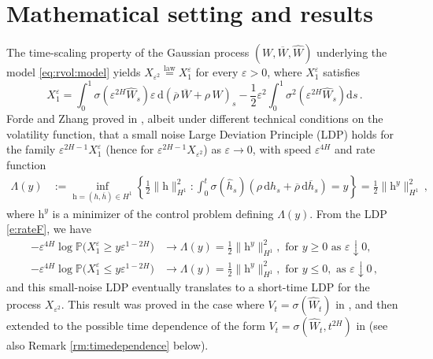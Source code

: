 \documentclass[11pt]{article}
\def\eqlaw{\stackrel{\mathrm{law}}{=}}
\theoremstyle{plain}
\theoremstyle{definition}
\theoremstyle{remark}
\renewcommand{\bar}{\overline}
\renewcommand{\hat}{\widehat}
\newcommand{\dd}{\mathrm{d}}
\newcommand{\bP}{\mathbb{P}}
\newcommand{\1}{\mathbf{1}}
\numberwithin{equation}{section}
\def\eps{\varepsilon}
\def\h{\mathrm h}
\begin{document}
\section{Mathematical setting and results}\label{sec:main_results}
\noindent The time-scaling property of the Gaussian process	$(W, \bar W, \hat W)$ underlying the model \eqref{eq:rvol:model}
yields $X_{\eps^2} \eqlaw X_1^{\varepsilon}$ for every $\eps > 0$, where $X_1^{\varepsilon}$ satisfies
\begin{equation}\label{eq:rescX}
X_1^{\varepsilon} 
=
\int_{0}^1 \sigma \left( \eps^{2H} \hat W_s \right) \varepsilon \,
\dd \left(\bar{\rho} \, \bar W+\rho \, W\right)_s -\frac{1}{2}\varepsilon ^{2}\int_{0}^1
\sigma^2 \left(   \eps^{2H} \hat W_s\right) \dd s \,.
\end{equation} 
Forde and Zhang proved in \cite{forde2017asymptotics}, albeit under different technical conditions on the volatility function,
that a small noise Large Deviation Principle (LDP) holds for the 
family $\eps^{2 H - 1} X^{\eps}_1$ (hence for $\eps^{2 H - 1} X_{\eps^2}$) as $\eps \to 0$, with speed $\eps^{4H}$ and rate function 
\begin{align} \label{e:rateF}
\Lambda(y) & :=\inf_{\h = (h, \bar h) \in H^{1}}\left\{
\frac 12 \| \h \|_{H^1}^2 :
\int_0^t \sigma\left(\hat h_s\right) (\rho \,\dd h_s + \bar \rho \, \dd \bar h_s)
= y\right\}
= 
\frac 12  \| \h^y \|_{H^1}^2 \,,
\end{align}
where $\h^y$ is a minimizer of the control problem defining $\Lambda(y)$.
From the LDP \eqref{e:rateF}, we have
\begin{align}\label{eq:ldp:sn}
     - \eps^{4H} \log \bP \bigl( X_1^\eps \geq y \eps^{1-2H} \bigr) &\rightarrow  \Lambda(y)= \frac{1}{2} \| { \h}^y  \|^2_{H^1},  \mbox{ for } y \geq 0 \mbox{ as } \eps \downarrow 0,
\\
     - \eps^{4H} \log \bP \bigl( X_1^\eps \leq y\eps^{1-2H} \bigr) &\rightarrow \Lambda (y)=
     \frac{1}{2} \| { \h}^y  \|^2_{H^1}, \mbox{ for } y \leq 0, \mbox{ as } \eps \downarrow 0 \,,
\end{align}
and this small-noise LDP eventually translates to a short-time LDP for the process $X_{\eps^2}$.
This result was proved in the case where $V_t = \sigma(\hat{W}_t)$ in \cite{forde2017asymptotics}, and then extended to the possible time dependence of the form $V_t = \sigma(\hat{W}_t,t^{2H})$ in \cite[Section 7.3]{friz2018precise1} (see also Remark \ref{rm:timedependence} below).
\end{document}
